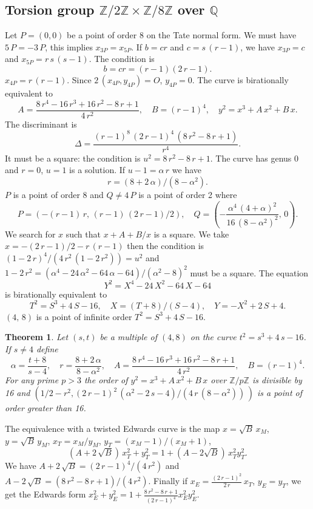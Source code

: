 \documentclass[a4paper, 11pt, pdftex]{report}
\theoremstyle{plain}
\newtheorem{theorem}{Theorem}[chapter]
\theoremstyle{definition}
\begin{document}
\subsection{Torsion group $\mathbb{Z}/2\mathbb{Z} \times \mathbb{Z}/8\mathbb{Z}$ over $\mathbb{Q}$}

Let $P = (0, 0)$ be a point of order 8 on the Tate normal form. We must have $5\,P = -3\,P$,
this implies $x_{3P} = x_{5P}$. If $b = cr$ and $c = s\,(r - 1)$,
we have $x_{3P} = c$ and $x_{5P} = r\,s\,(s - 1)$. The condition is
$$b = cr = (r - 1)(2\,r - 1).$$
$x_{4P} = r\,(r - 1)$. Since $2\,(x_{4P}, y_{4P}) = O$, $y_{4P} = 0$. The curve is 
birationally equivalent to
$$A = \frac{8\,r^4 - 16\,r^3 + 16\,r^2 - 8\,r + 1}{4\,r^2},\quad
B = (r - 1)^4,\quad y^2 = x^3 + A\,x^2 + B\,x.$$
The discriminant is
$$\Delta = \frac{(r - 1)^8\, (2\,r - 1)^4\, (8\,r^2 - 8\,r + 1)}{r^4}.$$
It must be a square: the condition is $u^2 = 8\,r^2 - 8\,r + 1$.
The curve has genus 0 and $r = 0$, $u = 1$ is a solution. If $u - 1 = \alpha\,r$ we have
$$r = (8 + 2\,\alpha) / (8 - \alpha^2).$$
$P$ is a point of order 8 and $Q \neq 4\,P$ is a point of order 2 where
$$P = \left(-(r - 1)\,r,\, (r - 1)\,(2\,r - 1) / 2\right),\quad
  Q = \left(-\frac{\alpha^4\,(4 + \alpha)^2}{16\,(8 - \alpha^2)^2},\, 0\right).$$
We search for $x$ such that $x + A + B / x$ is a square. We take
$x = -(2\,r - 1)/2 - r\,(r - 1)$ then
the condition is $(1 - 2\,r)^4 / (4\,r^2\,(1 - 2\,r^2)) = u^2$ and
$1 - 2\,r^2 = (\alpha^4 - 24\,\alpha^2 - 64\,\alpha - 64) / (\alpha^2 - 8)^2$
must be a square. The equation
$$Y^2 = X^4 - 24\,X^2 - 64\,X - 64$$
is birationally equivalent to
$$T^2 = S^3 + 4\,S - 16,\quad X = (T + 8) / (S - 4),\quad Y = -X^2 + 2\,S + 4.$$
$(4,\, 8)$ is a point of infinite order $T^2 = S^3 + 4\,S - 16$.

\begin{theorem}
Let $(s, t)$ be a multiple of $(4, 8)$ on the curve $t^2 = s^3 + 4\,s - 16$. If
$s \neq 4$  define
$$\alpha = \frac{t + 8}{s - 4},\quad r = \frac{8 + 2\,\alpha}{8 - \alpha^2},\quad
A = \frac{8\,r^4 - 16\,r^3 + 16\,r^2 - 8\,r + 1}{4\,r^2},\quad
B = (r - 1)^4.$$
For any prime $p > 3$ the order of $y^2 = x^3 + A\, x^2 + B\, x$ over $\mathbb{Z}/p\mathbb{Z}$
is divisible by 16 and $(1/2 - r^2,
(2\,r - 1)^2\, (\alpha^2 - 2\,s - 4) / (4\,r\,(8 - \alpha^2))\,)$ is
a point of order greater than 16.
\end{theorem}

The equivalence with a twisted Edwards curve is the map $x = \sqrt{B}\,x_M$, $y = \sqrt{B}\,y_M$,
$x_T = x_M / y_M$, $y_T = (x_M - 1)/(x_M + 1)$,
$$(A + 2\,\sqrt{B})\,x_T^2 + y_T^2 = 1 + (A - 2\sqrt{B})\,x_T^2y_T^2.$$
We have $A + 2\,\sqrt{B} = (2\,r - 1)^4 / (4\,r^2)$ and
$A - 2\,\sqrt{B} = (8\,r^2 - 8\,r + 1) / (4\,r^2)$.
Finally if $x_E = \frac{(2\,r - 1)^2}{2\,r}\,x_T$, $y_E = y_T$, we get the Edwards form
$x_E^2 + y_E^2 = 1 + \frac{8\,r^2 - 8\,r + 1}{(2\,r - 1)^4} x_E^2y_E^2$.
\end{document}
